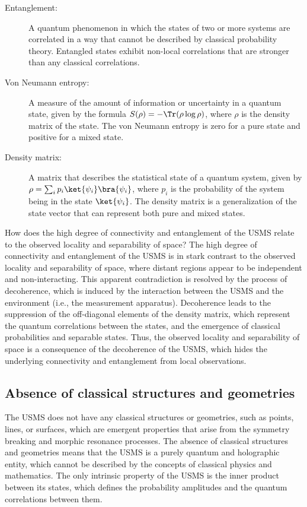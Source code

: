 \begin{tcolorbox}[colback=blue!5!white,colframe=blue!75!black,title=New terms]
\begin{description}
\item[Entanglement:] A quantum phenomenon in which the states of two or more systems are correlated in a way that cannot be described by classical probability theory. Entangled states exhibit non-local correlations that are stronger than any classical correlations.
\item[Von Neumann entropy:] A measure of the amount of information or uncertainty in a quantum state, given by the formula $S(\rho) = -\Tr(\rho \log \rho)$, where $\rho$ is the density matrix of the state. The von Neumann entropy is zero for a pure state and positive for a mixed state.
\item[Density matrix:] A matrix that describes the statistical state of a quantum system, given by $\rho = \sum_i p_i \ket{\psi_i}\bra{\psi_i}$, where $p_i$ is the probability of the system being in the state $\ket{\psi_i}$. The density matrix is a generalization of the state vector that can represent both pure and mixed states.
\end{description}
\end{tcolorbox}

\begin{tcolorbox}[colback=green!5!white,colframe=green!75!black,title=Question]
How does the high degree of connectivity and entanglement of the USMS relate to the observed locality and separability of space?
\tcblower
The high degree of connectivity and entanglement of the USMS is in stark contrast to the observed locality and separability of space, where distant regions appear to be independent and non-interacting. This apparent contradiction is resolved by the process of decoherence, which is induced by the interaction between the USMS and the environment (i.e., the measurement apparatus). Decoherence leads to the suppression of the off-diagonal elements of the density matrix, which represent the quantum correlations between the states, and the emergence of classical probabilities and separable states. Thus, the observed locality and separability of space is a consequence of the decoherence of the USMS, which hides the underlying connectivity and entanglement from local observations.
\end{tcolorbox}

\subsection{Absence of classical structures and geometries}
The USMS does not have any classical structures or geometries, such as points, lines, or surfaces, which are emergent properties that arise from the symmetry breaking and morphic resonance processes. The absence of classical structures and geometries means that the USMS is a purely quantum and holographic entity, which cannot be described by the concepts of classical physics and mathematics. The only intrinsic property of the USMS is the inner product between its states, which defines the probability amplitudes and the quantum correlations between them.

